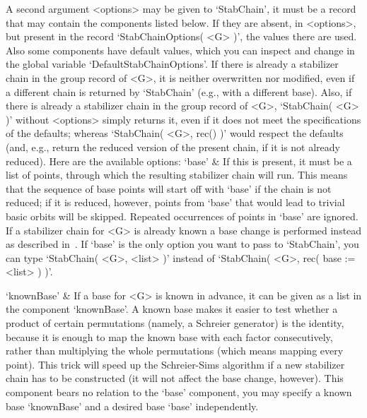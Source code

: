 A second argument <options>  may be given to `StabChain',   it must be  a
record that may contain the components listed  below. If they are absent,
in  <options>, but present in the   record `StabChainOptions( <G> )', the
values  there are used.  Also some components  have default values, which
you   can  inspect    and       change   in   the    global      variable
`DefaultStabChainOptions'. If there is already a  stabilizer chain in the
group record  of <G>, it is neither  overwritten nor modified, even  if a
different chain is returned by `StabChain' (e.g., with a different base).
Also, if there is already a stabilizer chain  in the group record of <G>,
`StabChain( <G> )'  without <options> simply  returns it, even if it does
not meet the specifications   of the defaults; whereas `StabChain(   <G>,
rec() )'  would respect  the  defaults  (and, e.g.,  return the   reduced
version of the present chain, if it is not already reduced). Here are the
available options:
\beginitems
`base' &
        If this is  present, it must be  a list of  points, through which
        the resulting stabilizer   chain  will run. This  means  that the
        sequence  of base points will start  off with `base' if the chain
        is not  reduced; if it is  reduced,  however, points  from `base'
        that would lead to trivial basic orbits will be skipped. Repeated
        occurrences  of  points in `base'  are  ignored.  If a stabilizer
        chain for <G> is already known a base change is performed instead
        as described  in~\cite{Butler82b}. If `base'   is the only option
        you want to  pass to `StabChain', you  can type  `StabChain( <G>,
        <list> )' instead of `StabChain( <G>, rec( base := <list> ) )'.

`knownBase' &
        If a base for <G> is known in advance, it can be  given as a list
        in the component  `knownBase'. A  known  base makes it easier  to
        test whether a   product   of certain permutations  (namely,    a
        Schreier generator) is the identity, because  it is enough to map
        the known base  with   each  factor consecutively, rather    than
        multiplying the   whole permutations (which means   mapping every
        point). This trick will speed up the Schreier-Sims algorithm if a
        new  stabilizer chain has to  be constructed (it  will not affect
        the  base change, however). This   component bears no relation to
        the  `base' component, you  may specify a  known base `knownBase'
        and a desired base `base' independently.


